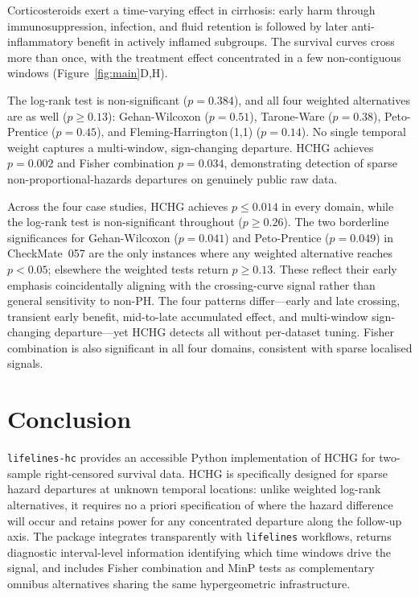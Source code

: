 \documentclass[unnumsec,webpdf,contemporary,large]{oup-authoring-template}
\begin{document}
Corticosteroids exert a time-varying effect in cirrhosis: early harm through
immunosuppression, infection, and fluid retention is followed by later
anti-inflammatory benefit in actively inflamed subgroups. The survival
curves cross more than once, with the treatment effect concentrated in a
few non-contiguous windows (Figure~\ref{fig:main}D,H).

The log-rank test is non-significant ($p = 0.384$), and all four weighted
alternatives are as well ($p \geq 0.13$): Gehan-Wilcoxon ($p = 0.51$),
Tarone-Ware ($p = 0.38$), Peto-Prentice ($p = 0.45$), and
Fleming-Harrington\,(1,1) ($p = 0.14$). No single temporal weight
captures a multi-window, sign-changing departure. HCHG achieves
$p = 0.002$ and Fisher combination $p = 0.034$, demonstrating detection
of sparse non-proportional-hazards departures on genuinely public raw data.

Across the four case studies, HCHG achieves $p \leq 0.014$ in every domain,
while the log-rank test is non-significant throughout ($p \geq 0.26$). The
two borderline significances for Gehan-Wilcoxon ($p = 0.041$) and
Peto-Prentice ($p = 0.049$) in CheckMate~057 are the only instances where
any weighted alternative reaches $p < 0.05$; elsewhere the weighted tests
return $p \geq 0.13$. These reflect their early emphasis coincidentally
aligning with the crossing-curve signal rather than general sensitivity
to non-PH. The four patterns differ---early
and late crossing, transient early benefit, mid-to-late accumulated effect,
and multi-window sign-changing departure---yet HCHG detects all without
per-dataset tuning. Fisher combination is also significant in all four
domains, consistent with sparse localised signals.


\section{Conclusion}

\texttt{lifelines-hc} provides an accessible Python implementation of
HCHG for two-sample right-censored survival data. HCHG is specifically
designed for sparse hazard departures at unknown temporal locations:
unlike weighted log-rank alternatives, it requires no a priori
specification of where the hazard difference will occur and retains
power for any concentrated departure along the follow-up axis. The
package integrates transparently with \texttt{lifelines} workflows,
returns diagnostic interval-level information identifying which time
windows drive the signal, and includes Fisher combination and MinP tests
as complementary omnibus alternatives sharing the same hypergeometric
infrastructure.
\end{document}
